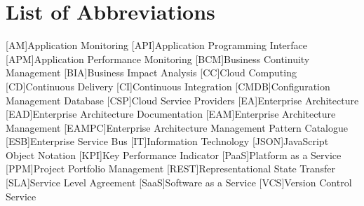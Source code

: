 
\chapter*{List of Abbreviations}

\begin{acronym}[ewuifbwejkbfjksbjkcbsdjcjkn3j]%
[AM]{Application Monitoring}
[API]{Application Programming Interface}
[APM]{Application Performance Monitoring}
[BCM]{Business Continuity Management}
[BIA]{Business Impact Analysis}
[CC]{Cloud Computing}
[CD]{Continuous Delivery}
[CI]{Continuous Integration}
[CMDB]{Configuration Management Database}
[CSP]{Cloud Service Providers}
[EA]{Enterprise Architecture}
[EAD]{Enterprise Architecture Documentation}
[EAM]{Enterprise Architecture Management}
[EAMPC]{Enterprise Architecture Management Pattern Catalogue}
[ESB]{Enterprise Service Bus}
[IT]{Information Technology}
[JSON]{JavaScript Object Notation}
[KPI]{Key Performance Indicator}
[PaaS]{Platform as a Service}
[PPM]{Project Portfolio Management}
[REST]{Representational State Transfer}
[SLA]{Service Level Agreement}
[SaaS]{Software as a Service}
[VCS]{Version Control Service}

%


\end{acronym}